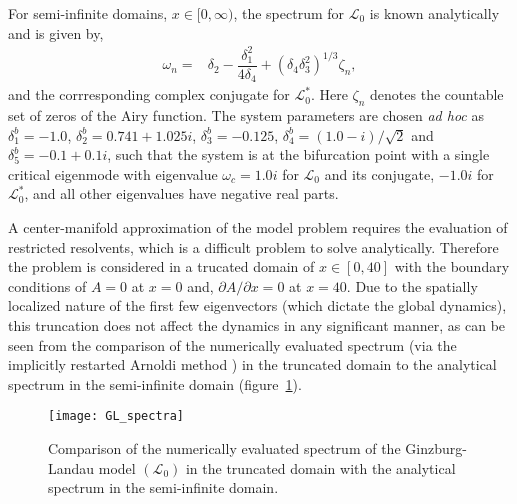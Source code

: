 For semi-infinite domains, $x\in[0,\infty)$, the spectrum for $\mathcal{L}_{0}$ is known analytically \citep{chomaz88} and is given by,
	\begin{align}
		\omega_{n}	=& \delta_{2} - \dfrac{\delta_{1}^{2}}{4\delta_{4}} + (\delta_{4}\delta_{3}^{2})^{1/3}\zeta_{n}, \label{eqn:eigenvalues} 
	\end{align}
and the corrresponding complex conjugate for $\mathcal{L}^{*}_{0}$. Here $\zeta_{n}$ denotes the countable set of zeros of the Airy function. The system parameters are chosen \emph{ad hoc} as $\delta^{b}_{1} = -1.0$, $\delta^{b}_{2} = 0.741 + 1.025i$, $\delta^{b}_{3}=-0.125$, $\delta^{b}_{4}=(1.0 - i)/\sqrt{2}$ and $\delta^{b}_{5} =-0.1+0.1i$, such that the system is at the bifurcation point with a single critical eigenmode with eigenvalue $\omega_{c} = 1.0i$ for $\mathcal{L}_{0}$ and its conjugate, $-1.0i$ for $\mathcal{L}^{*}_{0}$, and all other eigenvalues have negative real parts. 
 
 A center-manifold approximation of the model problem requires the evaluation of restricted resolvents, which is a difficult problem to solve analytically. Therefore the problem is considered in a trucated domain of $x\in [0,40]$ with the boundary conditions of $A = 0$ at $x=0$ and, $\partial A/\partial x = 0$ at $x=40$. Due to the spatially localized nature of the first few eigenvectors (which dictate the global dynamics), this truncation does not affect the dynamics in any significant manner, as can be seen from the comparison of the numerically evaluated spectrum (via the implicitly restarted Arnoldi method \citep{sorensen92}) in the truncated domain to the analytical spectrum in the semi-infinite domain (figure~\ref{fig:GL_spectrum}). 
\begin{figure}
	\centering
	\texttt{[image: GL\_spectra]}
	\caption{Comparison of the numerically evaluated spectrum of the Ginzburg-Landau model $(\mathcal{L}_{0})$ in the truncated domain with the analytical spectrum in the semi-infinite domain.}
	\label{fig:GL_spectrum}
\end{figure}

